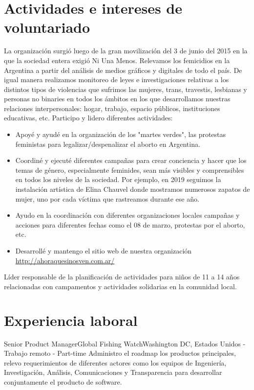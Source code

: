 \documentclass[11pt,a4paper,sans]{moderncv}
\begin{document}
\section{Actividades e intereses de voluntariado}
{
La organización surgió luego de la gran movilización del 3 de junio del 2015 en la que la sociedad entera exigió Ni Una Menos.  Relevamos los femicidios en la Argentina a partir del análisis de medios gráficos y digitales de todo el país. De igual manera realizamos monitoreo de leyes e investigaciones relativas a los distintos tipos de violencias que sufrimos las mujeres, trans, travestis, lesbianas y personas no binaries en todos los ámbitos en los que desarrollamos nuestras relaciones interpersonales: hogar, trabajo, espacio públicos, instituciones educativas, etc. Participo y lidero diferentes actividades:
}
\begin{itemize}
  \item Apoyé y ayudé en la organización de los "martes verdes", las protestas feministas para legalizar/despenalizar el aborto en Argentina.
  \item Coordiné y ejecuté diferentes campañas para crear conciencia y hacer que los temas de género, especialmente feminides, sean más visibles y comprensibles en todos los niveles de la sociedad. Por ejemplo, en 2019 seguimos la instalación artística de Elina Chauvel donde mostramos numerosos zapatos de mujer, uno por cada víctima que rastreamos durante ese año.
  \item Ayudo en la coordinación con diferentes organizaciones locales campañas y acciones para diferentes fechas como el 08 de marzo, protestas por el aborto, etc.
  \item Desarrollé y mantengo el sitio web de nuestra organización {\url{http://ahoraquesinosven.com.ar/}}
\newline
\end{itemize}

{Líder responsable de la planificación de actividades para niños de 11 a 14 años relacionadas con campamentos y actividades solidarias en la comunidad local.}


\section{Experiencia laboral}
 {Senior Product Manager}{Global Fishing Watch}{Washington DC, Estados Unidos - Trabajo remoto - Part-time }{}{}{}
  Administro el roadmap los productos principales, relevo requerimientos de diferentes actores como los equipos de Ingeniería, Investigación, Análisis, Comunicaciones y Transparencia para desarrollar conjuntamente el producto de software.
\newline
\newline
\end{document}
